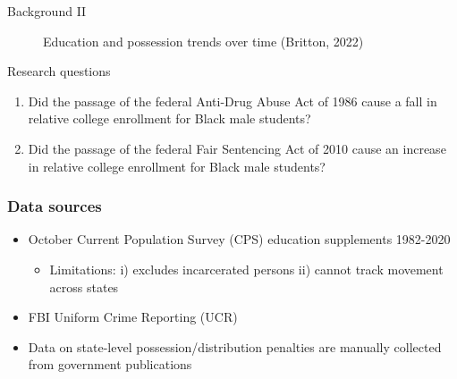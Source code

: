 \documentclass{beamer}
\begin{document}
\begin{frame}{Background II}
    \begin{figure}%
    \centering
    \qquad
    \caption{Education and possession trends over time (Britton, 2022)}
    \label{fig:example}%
\end{figure}
\end{frame}


\begin{frame}{Research questions}
    \begin{enumerate}
        \item Did the passage of the federal Anti-Drug Abuse Act of 1986 cause a fall in relative college enrollment for Black male students?
        \item Did the passage of the federal Fair Sentencing Act of 2010 cause an increase in relative college enrollment for Black male students?
    \end{enumerate}
\end{frame}


\begin{frame}
\frametitle{Data sources}
\begin{itemize}
  \item October Current Population Survey (CPS) education supplements 1982-2020
  \begin{itemize}
      \item Limitations: i) excludes incarcerated persons ii) cannot track movement across states
  \end{itemize}
  \item FBI Uniform Crime Reporting (UCR)
  \item Data on state-level possession/distribution penalties are manually collected from government publications
\end{itemize}
\end{frame}
\end{document}

